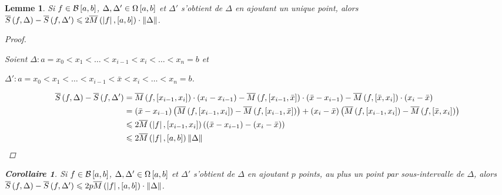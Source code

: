 \documentclass{report}
\newcommand*{\norme}[1]{\left\| #1 \right\|}
\newcommand*{\abs}[1]{\left| #1 \right|}
\newcommand*{\lte}{\leqslant}
\newtheorem*{lem}{Lemme}
\newtheorem*{coro}{Corollaire}
\theoremstyle{definition}
\theoremstyle{remark}
\begin{document}
	\begin{lem}
		Si $f \in \bornee$, $\Delta,\Delta' \in \partitions$ et $\Delta'$ s'obtient de $\Delta$ en ajoutant un unique point, alors $\ssup{f} - \ssup{f}[\Delta'] \lte 2\msup{\abs{f}}[a,b] \cdot \norme{\Delta}$.

		\begin{proof}~

			Soient $\Delta:a=x_0 < x_1 < \dotsc < x_{i-1} < x_i < \dotsc < x_n=b$ et

			$\Delta':a=x_0 < x_1 < \dotsc < x_{i-1} < \bar{x} < x_i < \dotsc < x_n=b$.

			\begin{align*}
				\ssup{f} - \ssup{f}[\Delta'] &= \msup{f}[x_{i-1},x_i] \cdot \left( x_i-x_{i-1} \right) - \msup{f}[x_{i-1},\bar{x}] \cdot \left( \bar{x}-x_{i-1} \right) - \msup{f}[\bar{x},x_i] \cdot \left( x_i-\bar{x} \right)\\
				&= \left( \bar{x}-x_{i-1} \right) \left( \msup{f}[x_{i-1},x_i] - \msup{f}[x_{i-1},\bar{x}] \right) + \left( x_i-\bar{x} \right) \left( \msup{f}[x_{i-1},x_i] - \msup{f}[\bar{x},x_i] \right)\\
				&\lte 2\msup{\abs{f}}[x_{i-1},x_i] \left( \left( \bar{x}-x_{i-1} \right) - \left( x_i-\bar{x} \right) \right)\\
				&\lte 2\msup{\abs{f}} \norme{\Delta}
			\end{align*}
		\end{proof}

		\begin{coro}
			Si $f \in \bornee$, $\Delta,\Delta' \in \partitions$ et $\Delta'$ s'obtient de $\Delta$ en ajoutant $p$ points, au plus un point par sous-intervalle de $\Delta$, alors $\ssup{f} - \ssup{f}[\Delta'] \lte 2p\msup{\abs{f}}[a,b] \cdot \norme{\Delta}$.
		\end{coro}
	\end{lem}
\end{document}
